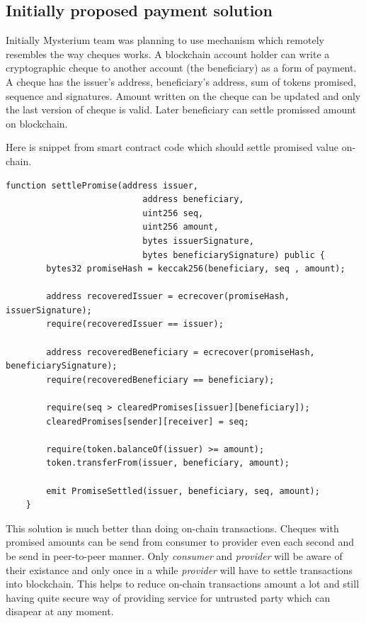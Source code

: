 \documentclass[a4paper,12pt]{article}
\begin{document}
\subsection{Initially proposed payment solution}

Initially Mysterium team was planning to use mechanism which remotely resembles 
the way cheques works. A blockchain account holder can write a cryptographic 
cheque to another account (the beneficiary) as a form of payment. A cheque has 
the issuer's address, beneficiary's address, sum of tokens promised, sequence 
and signatures. Amount written on the cheque can be updated and only the last 
version of cheque is valid. Later beneficiary can settle promissed amount on 
blockchain. 

Here is snippet from smart contract code which should settle promised value 
on-chain.

\begin{lstlisting}[language=Solidity]
    function settlePromise(address issuer, 
                           address beneficiary, 
                           uint256 seq, 
                           uint256 amount, 
                           bytes issuerSignature,
                           bytes beneficiarySignature) public {
        bytes32 promiseHash = keccak256(beneficiary, seq , amount);

        address recoveredIssuer = ecrecover(promiseHash, issuerSignature);
        require(recoveredIssuer == issuer);

        address recoveredBeneficiary = ecrecover(promiseHash, beneficiarySignature);
        require(recoveredBeneficiary == beneficiary);

        require(seq > clearedPromises[issuer][beneficiary]);
        clearedPromises[sender][receiver] = seq;

        require(token.balanceOf(issuer) >= amount);
        token.transferFrom(issuer, beneficiary, amount);

        emit PromiseSettled(issuer, beneficiary, seq, amount);
    }
\end{lstlisting}

This solution is much better than doing on-chain transactions. Cheques with 
promised amounts can be send from consumer to provider even each second and be
send in peer-to-peer manner. Only \textit{consumer} and \textit{provider} will
be aware of their existance and only once in a while \textit{provider} will have
to settle transactions into blockchain. This helps to reduce on-chain 
transactions amount a lot and still having quite secure way of providing service
for untrusted party which can disapear at any moment. 
\end{document}
